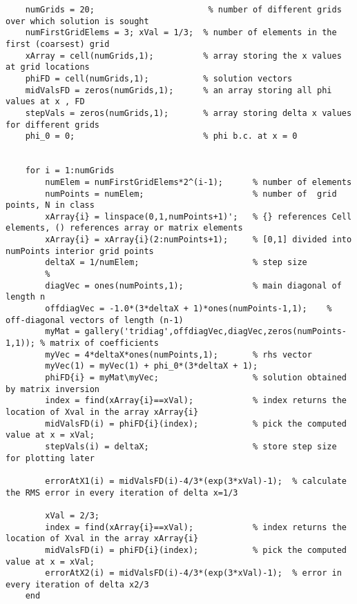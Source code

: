 \documentclass{article}
\begin{document}
     \begin{lstlisting}
    numGrids = 20;                       % number of different grids over which solution is sought
    numFirstGridElems = 3; xVal = 1/3;  % number of elements in the first (coarsest) grid
    xArray = cell(numGrids,1);          % array storing the x values at grid locations
    phiFD = cell(numGrids,1);           % solution vectors
    midValsFD = zeros(numGrids,1);      % an array storing all phi values at x , FD
    stepVals = zeros(numGrids,1);       % array storing delta x values for different grids
    phi_0 = 0;                          % phi b.c. at x = 0

    
    for i = 1:numGrids
        numElem = numFirstGridElems*2^(i-1);      % number of elements
        numPoints = numElem;                      % number of  grid points, N in class
        xArray{i} = linspace(0,1,numPoints+1)';   % {} references Cell elements, () references array or matrix elements
        xArray{i} = xArray{i}(2:numPoints+1);     % [0,1] divided into numPoints interior grid points
        deltaX = 1/numElem;                       % step size
        %
        diagVec = ones(numPoints,1);              % main diagonal of length n
        offdiagVec = -1.0*(3*deltaX + 1)*ones(numPoints-1,1);    % off-diagonal vectors of length (n-1)
        myMat = gallery('tridiag',offdiagVec,diagVec,zeros(numPoints-1,1)); % matrix of coefficients
        myVec = 4*deltaX*ones(numPoints,1);       % rhs vector
        myVec(1) = myVec(1) + phi_0*(3*deltaX + 1);
        phiFD{i} = myMat\myVec;                   % solution obtained by matrix inversion
        index = find(xArray{i}==xVal);            % index returns the location of Xval in the array xArray{i}
        midValsFD(i) = phiFD{i}(index);           % pick the computed value at x = xVal; 
        stepVals(i) = deltaX;                     % store step size for plotting later

        errorAtX1(i) = midValsFD(i)-4/3*(exp(3*xVal)-1);  % calculate the RMS error in every iteration of delta x=1/3
        
        xVal = 2/3;
        index = find(xArray{i}==xVal);            % index returns the location of Xval in the array xArray{i}
        midValsFD(i) = phiFD{i}(index);           % pick the computed value at x = xVal; 
        errorAtX2(i) = midValsFD(i)-4/3*(exp(3*xVal)-1);  % error in every iteration of delta x2/3
    end
         
     \end{lstlisting}
\end{document}
